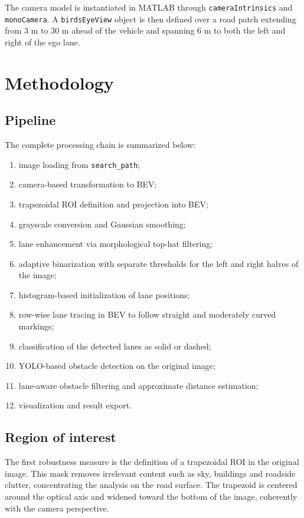 \documentclass[conference]{IEEEtran}
\begin{document}
The camera model is instantiated in MATLAB through \texttt{cameraIntrinsics} and \texttt{monoCamera}. A \texttt{birdsEyeView} object is then defined over a road patch extending from 3 m to 30 m ahead of the vehicle and spanning 6 m to both the left and right of the ego lane.

\section{Methodology}
\subsection{Pipeline}
The complete processing chain is summarized below:
\begin{enumerate}
    \item image loading from \texttt{search\_path};
    \item camera-based transformation to BEV;
    \item trapezoidal ROI definition and projection into BEV;
    \item grayscale conversion and Gaussian smoothing;
    \item lane enhancement via morphological top-hat filtering;
    \item adaptive binarization with separate thresholds for the left and right halves of the image;
    \item histogram-based initialization of lane positions;
    \item row-wise lane tracing in BEV to follow straight and moderately curved markings;
    \item classification of the detected lanes as solid or dashed;
    \item YOLO-based obstacle detection on the original image;
    \item lane-aware obstacle filtering and approximate distance estimation;
    \item visualization and result export.
\end{enumerate}

\subsection{Region of interest}
The first robustness measure is the definition of a trapezoidal ROI in the original image. This mask removes irrelevant content such as sky, buildings and roadside clutter, concentrating the analysis on the road surface. The trapezoid is centered around the optical axis and widened toward the bottom of the image, coherently with the camera perspective.
\end{document}
